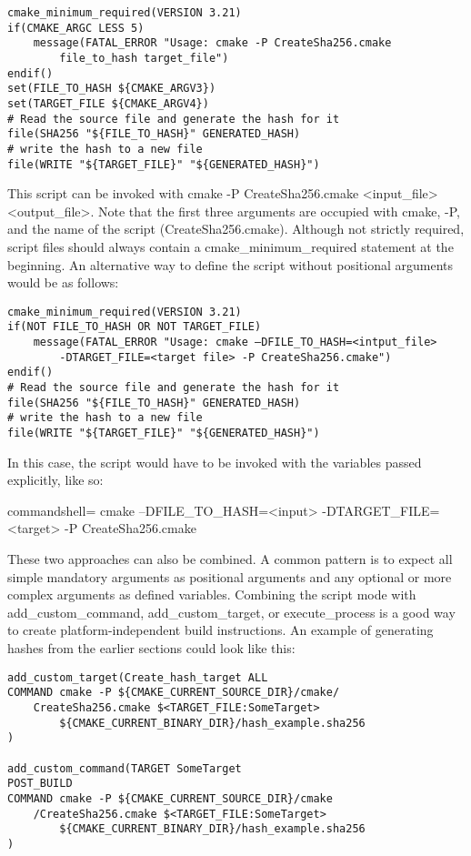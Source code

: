 \begin{lstlisting}[style=styleCMake]
cmake_minimum_required(VERSION 3.21)
if(CMAKE_ARGC LESS 5)
	message(FATAL_ERROR "Usage: cmake -P CreateSha256.cmake
		file_to_hash target_file")
endif()
set(FILE_TO_HASH ${CMAKE_ARGV3})
set(TARGET_FILE ${CMAKE_ARGV4})
# Read the source file and generate the hash for it
file(SHA256 "${FILE_TO_HASH}" GENERATED_HASH)
# write the hash to a new file
file(WRITE "${TARGET_FILE}" "${GENERATED_HASH}")
\end{lstlisting}

This script can be invoked with cmake -P CreateSha256.cmake <input\_file> <output\_file>. Note that the first three arguments are occupied with cmake, -P, and the name of the script (CreateSha256.cmake). Although not strictly required, script files should always contain a cmake\_minimum\_required statement at the beginning. An alternative way to define the script without positional arguments would be as follows:

\begin{lstlisting}[style=styleCMake]
cmake_minimum_required(VERSION 3.21)
if(NOT FILE_TO_HASH OR NOT TARGET_FILE)
	message(FATAL_ERROR "Usage: cmake –DFILE_TO_HASH=<intput_file> 
		-DTARGET_FILE=<target file> -P CreateSha256.cmake")
endif()
# Read the source file and generate the hash for it
file(SHA256 "${FILE_TO_HASH}" GENERATED_HASH)
# write the hash to a new file
file(WRITE "${TARGET_FILE}" "${GENERATED_HASH}")
\end{lstlisting}

In this case, the script would have to be invoked with the variables passed explicitly, like so:

\begin{tcblisting}{commandshell={}}
cmake –DFILE_TO_HASH=<input>
      -DTARGET_FILE=<target> -P CreateSha256.cmake
\end{tcblisting}

These two approaches can also be combined. A common pattern is to expect all simple mandatory arguments as positional arguments and any optional or more complex arguments as defined variables. Combining the script mode with add\_custom\_command, add\_custom\_target, or execute\_process is a good way to create platform-independent build instructions. An example of generating hashes from the earlier sections could look like this:

\begin{lstlisting}[style=styleCMake]
add_custom_target(Create_hash_target ALL
COMMAND cmake -P ${CMAKE_CURRENT_SOURCE_DIR}/cmake/
	CreateSha256.cmake $<TARGET_FILE:SomeTarget>
		${CMAKE_CURRENT_BINARY_DIR}/hash_example.sha256
)

add_custom_command(TARGET SomeTarget
POST_BUILD
COMMAND cmake -P ${CMAKE_CURRENT_SOURCE_DIR}/cmake
	/CreateSha256.cmake $<TARGET_FILE:SomeTarget>
		${CMAKE_CURRENT_BINARY_DIR}/hash_example.sha256
)
\end{lstlisting}

